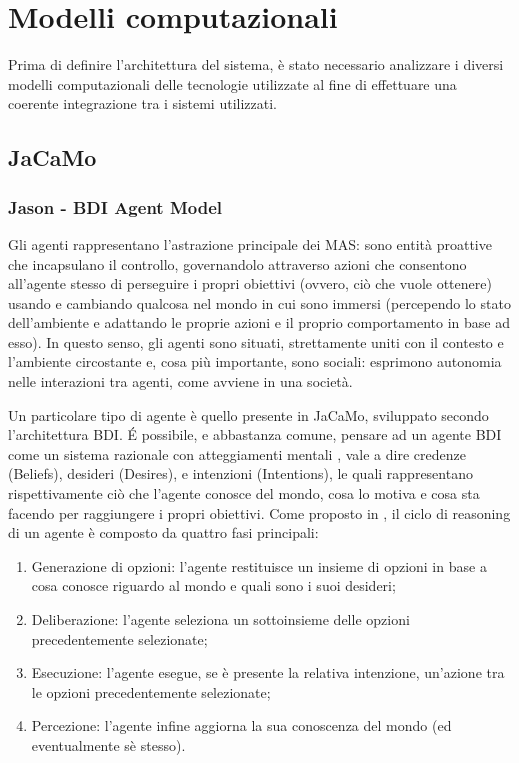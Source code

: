 \section{Modelli computazionali}

Prima di definire l'architettura del sistema, è stato necessario analizzare i diversi modelli computazionali delle tecnologie utilizzate al fine di effettuare una coerente integrazione tra i sistemi utilizzati. 

\subsection{JaCaMo}

\subsubsection{Jason - BDI Agent Model}

Gli agenti rappresentano l'astrazione principale dei MAS: sono entità proattive che incapsulano il controllo, governandolo attraverso azioni che consentono all'agente stesso di perseguire i propri obiettivi (ovvero, ciò che vuole ottenere) usando e cambiando qualcosa nel mondo in cui sono immersi (percependo lo stato dell'ambiente e adattando le proprie azioni e il proprio comportamento in base ad esso). In questo senso, gli agenti sono situati, strettamente uniti con il contesto e l'ambiente circostante e, cosa più importante, sono sociali: esprimono autonomia nelle interazioni tra agenti, come avviene in una società.

\medskip

Un particolare tipo di agente è quello presente in JaCaMo, sviluppato secondo l'architettura BDI. \'E possibile, e abbastanza comune, pensare ad un agente BDI come un sistema razionale con atteggiamenti mentali \cite{rao1995bdi}, vale a dire credenze (Beliefs), desideri (Desires), e intenzioni (Intentions), le quali rappresentano rispettivamente ciò che l'agente conosce del mondo, cosa lo motiva e cosa sta facendo per raggiungere i propri obiettivi. Come proposto in \cite{rao1995bdi}, il ciclo di reasoning di un agente è composto da quattro fasi principali:

\begin{enumerate}
    \item Generazione di opzioni: l'agente restituisce un insieme di opzioni in base a cosa conosce riguardo al mondo e quali sono i suoi desideri;
    \item Deliberazione: l'agente seleziona un sottoinsieme delle opzioni precedentemente selezionate;
    \item Esecuzione: l'agente esegue, se è presente la relativa intenzione, un'azione tra le opzioni precedentemente selezionate;
    \item Percezione: l’agente infine aggiorna la sua conoscenza del mondo (ed eventualmente sè stesso).
\end{enumerate}

